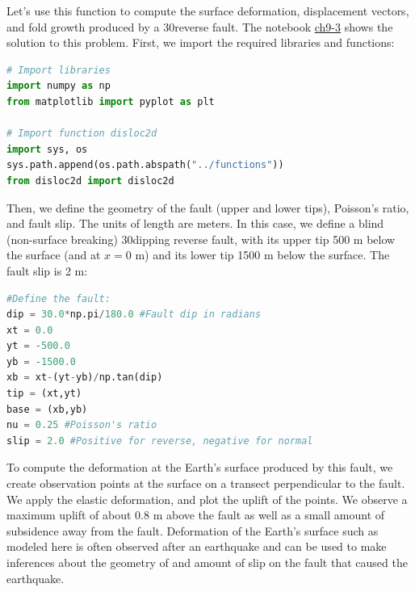 \documentclass[a4paper , 12pt]{book}
\begin{document}
Let's use this function to compute the surface deformation, displacement vectors, and fold growth produced by a 30\degree reverse fault. The notebook \href{https://github.com/nfcd/compGeo/blob/master/source/notebooks/ch9-3.ipynb}{ch9-3} shows the solution to this problem. First, we import the required libraries and functions:

\begin{lstlisting}[language=Python, frame=single]
# Import libraries
import numpy as np
from matplotlib import pyplot as plt

# Import function disloc2d
import sys, os
sys.path.append(os.path.abspath("../functions"))
from disloc2d import disloc2d
\end{lstlisting}

Then, we define the geometry of the fault (upper and lower tips), Poisson's ratio, and fault slip. The units of length are meters. In this case, we define a blind (non-surface breaking) 30\degree dipping reverse fault, with its upper tip 500 m below the surface (and at $x = 0$ m) and its lower tip 1500 m below the surface. The fault slip is 2 m:

\begin{lstlisting}[language=Python, frame=single]
#Define the fault:
dip = 30.0*np.pi/180.0 #Fault dip in radians
xt = 0.0
yt = -500.0
yb = -1500.0
xb = xt-(yt-yb)/np.tan(dip)
tip = (xt,yt)
base = (xb,yb)
nu = 0.25 #Poisson's ratio
slip = 2.0 #Positive for reverse, negative for normal
\end{lstlisting}

To compute the deformation at the Earth's surface produced by this fault, we create observation points at the surface on a transect perpendicular to the fault. We apply the elastic deformation, and plot the uplift of the points. We observe a maximum uplift of about 0.8 m above the fault as well as a small amount of subsidence away from the fault. Deformation of the Earth’s surface such as modeled here is often observed after an earthquake and can be used to make inferences about the geometry of and amount of slip on the fault that caused the earthquake.
\end{document}
